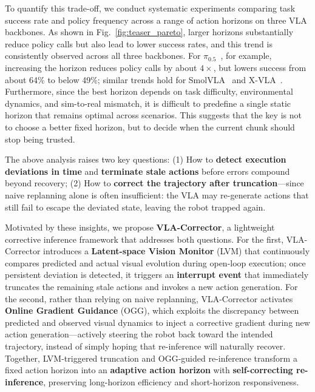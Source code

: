 To quantify this trade-off, we conduct systematic experiments comparing task success rate and policy frequency across a range of action horizons on three VLA backbones. As shown in Fig.~\ref{fig:teaser_pareto}, larger horizons substantially reduce policy calls but also lead to lower success rates, and this trend is consistently observed across all three backbones. For $\pi_{0.5}$~\cite{intelligence2025pi_}, for example, increasing the horizon reduces policy calls by about $4\times$, but lowers success from about 64\% to below 49\%; similar trends hold for SmolVLA~\cite{shukor2025smolvla} and X-VLA~\cite{zheng2025x}. Furthermore, since the best horizon depends on task difficulty, environmental dynamics, and sim-to-real mismatch, it is difficult to predefine a single static horizon that remains optimal across scenarios. This suggests that the key is not to choose a better fixed horizon, but to decide when the current chunk should stop being trusted. 

The above analysis raises two key questions: (1) How to \textbf{detect execution deviations in time} and \textbf{terminate stale actions} before errors compound beyond recovery;  (2) How to \textbf{correct the trajectory after truncation}---since naive replanning alone is often insufficient: the VLA may re-generate actions that still fail to escape the deviated state, leaving the robot trapped again.


Motivated by these insights, we propose \textbf{VLA-Corrector}, a lightweight corrective inference framework that addresses both questions. For the first, VLA-Corrector introduces a \textbf{Latent-space Vision Monitor} (LVM) that continuously compares predicted and actual visual evolution during open-loop execution; once persistent deviation is detected, it triggers an \textbf{interrupt event} that immediately truncates the remaining stale actions and invokes a new action generation. For the second, rather than relying on naive replanning, VLA-Corrector activates \textbf{Online Gradient Guidance} (OGG), which exploits the discrepancy between predicted and observed visual dynamics to inject a corrective gradient during new action generation---actively steering the robot back toward the intended trajectory, instead of simply hoping that re-inference will naturally recover. Together, LVM-triggered truncation and OGG-guided re-inference transform a fixed action horizon into an \textbf{adaptive action horizon} with \textbf{self-correcting re-inference}, preserving long-horizon efficiency and short-horizon responsiveness.

